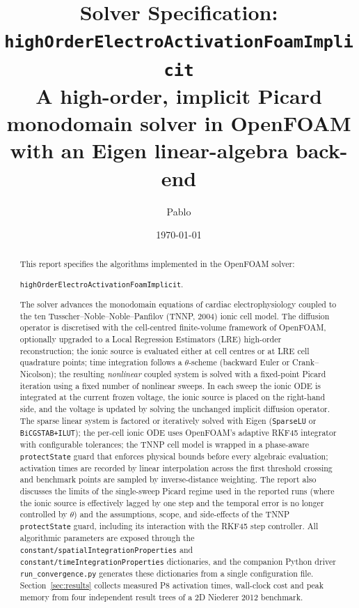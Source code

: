 \documentclass[11pt,a4paper]{article}
\title{Solver Specification:\\
       \texorpdfstring{\texttt{highOrderElectroActivationFoamImplicit}}{highOrderElectroActivationFoamImplicit}\\
       \large A high-order, implicit Picard
       monodomain solver in OpenFOAM with an Eigen linear-algebra back-end}
\author{Pablo}
\date{\today}
\newcommand{\code}[1]{\texttt{\small #1}}
\begin{document}
\maketitle

\begin{abstract}
This report specifies the algorithms implemented in the OpenFOAM solver:

\begin{center}
\code{highOrderElectroActivationFoamImplicit}.
\end{center}

The solver advances the
monodomain equations of cardiac electrophysiology coupled to the
ten Tusscher--Noble--Noble--Panfilov (TNNP, 2004) ionic cell model. The
diffusion operator is discretised with the cell-centred finite-volume
framework of OpenFOAM, optionally upgraded to a Local Regression Estimators
(LRE) high-order reconstruction; the ionic source is evaluated either at
cell centres or at LRE cell quadrature points; time integration follows a
$\theta$-scheme (backward Euler or Crank--Nicolson); the resulting
\emph{nonlinear} coupled system is solved with a fixed-point Picard
iteration using a fixed number of nonlinear sweeps. In each sweep the
ionic ODE is integrated at the current frozen voltage, the ionic source
is placed on the right-hand side, and the voltage is updated by solving
the unchanged implicit diffusion operator. The sparse linear system is
factored or iteratively solved with Eigen
(\code{SparseLU} or \code{BiCGSTAB+ILUT}); the per-cell ionic ODE uses
OpenFOAM's adaptive RKF45 integrator with configurable tolerances; the
TNNP cell model is wrapped in a phase-aware \code{protectState} guard
that enforces physical bounds before every algebraic evaluation;
activation times are recorded by linear interpolation across the first
threshold crossing and benchmark points are sampled by inverse-distance
weighting. The report also discusses the limits of the single-sweep
Picard regime used in the reported runs (where the ionic source is
effectively lagged by one step and the temporal error is no longer
controlled by $\theta$) and the assumptions, scope, and side-effects of
the TNNP \code{protectState} guard, including its interaction with the
RKF45 step controller. All algorithmic parameters are exposed through the
\code{constant/spatialIntegrationProperties} and
\code{constant/timeIntegrationProperties} dictionaries, and the
companion Python driver \code{run\_convergence.py} generates these
dictionaries from a single configuration file. Section~\ref{sec:results}
collects measured P8 activation times, wall-clock cost and peak memory
from four independent result trees of a 2D Niederer 2012 benchmark.
\end{abstract}
\end{document}
